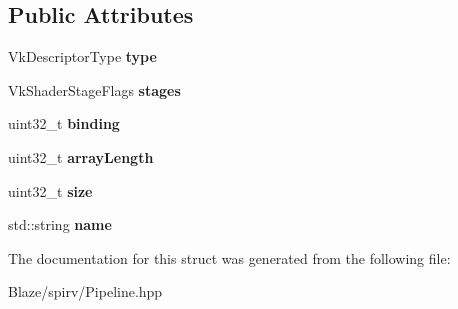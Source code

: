 \subsection*{Public Attributes}
\begin{DoxyCompactItemize}
\item 
\mbox{\label{structblaze_1_1spirv_1_1UniformInfo_a291148732556d9f47dc09b5ed7650371}} 
Vk\+Descriptor\+Type {\bfseries type}
\item 
\mbox{\label{structblaze_1_1spirv_1_1UniformInfo_a57c673c1f65a2a3ec61023b3782c6129}} 
Vk\+Shader\+Stage\+Flags {\bfseries stages}
\item 
\mbox{\label{structblaze_1_1spirv_1_1UniformInfo_afdbb99f3c149be3fe63f53e5220cf103}} 
uint32\+\_\+t {\bfseries binding}
\item 
\mbox{\label{structblaze_1_1spirv_1_1UniformInfo_aef51d2d588169944d5c1dfcfe45e7e8c}} 
uint32\+\_\+t {\bfseries array\+Length}
\item 
\mbox{\label{structblaze_1_1spirv_1_1UniformInfo_a472bc1a58d4a508b488dae87a2f39f66}} 
uint32\+\_\+t {\bfseries size}
\item 
\mbox{\label{structblaze_1_1spirv_1_1UniformInfo_a08301c73e6e9d4e0ff6c935d07bb06e0}} 
std\+::string {\bfseries name}
\end{DoxyCompactItemize}


The documentation for this struct was generated from the following file\+:\begin{DoxyCompactItemize}
\item 
Blaze/spirv/Pipeline.\+hpp\end{DoxyCompactItemize}
